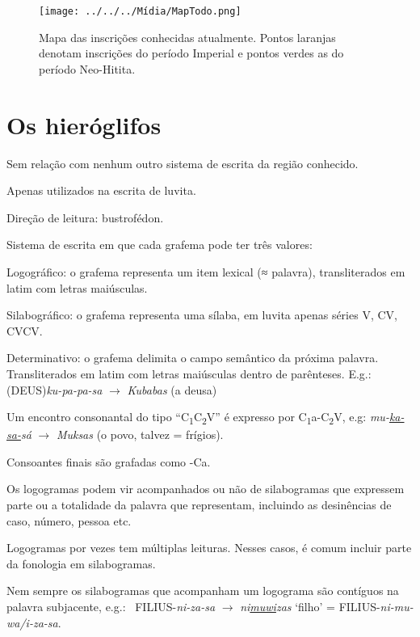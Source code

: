 \documentclass[article]{luvita}
\begin{document}
\begin{figure}[htb]
	\begin{center}
		\texttt{[image: ../../../Mídia/MapTodo.png]}
	\end{center}
	\caption{Mapa das inscrições conhecidas atualmente. Pontos laranjas
		denotam inscrições do período Imperial e pontos verdes as do período
		Neo-Hitita.
	}\label{fig:todo}
\end{figure}

\chapter{Os hieróglifos}

\begin{compactitem}
	\item Sem relação com nenhum outro sistema de escrita da região conhecido.
	\item Apenas utilizados na escrita de luvita.
	\item Direção de leitura: bustrofédon.
	\item Sistema de escrita em que cada grafema pode ter três valores:
	\begin{compactitem}
		\item Logográfico: o grafema representa um item lexical (≈ palavra),
		transliterados em latim com letras maiúsculas.
		\item Silabográfico: o grafema representa uma sílaba, em luvita apenas séries V,
		CV, CVCV.
		\item Determinativo: o grafema delimita o campo semântico da próxima
		palavra. Transliterados em latim com letras maiúsculas dentro de parênteses.
		E.g.:  (DEUS)\emph{ku-pa-pa-sa} $\rightarrow$ \emph{Kubabas} (a deusa)
	\end{compactitem}
	\item Um encontro consonantal do tipo ``C\textsubscript{1}C\textsubscript{2}V''
	é expresso por C\textsubscript{1}a-C\textsubscript{2}V, e.g:
	 \emph{mu-\uline{ka-sa-}sá} $\rightarrow$
	\emph{Muksas} (o povo, talvez = frígios).
	\item Consoantes finais são grafadas como -Ca.
	\item Os logogramas podem vir acompanhados ou não de silabogramas que expressem
	parte ou a totalidade da palavra que representam, incluindo as desinências de
	caso, número, pessoa etc.
	\item Logogramas por vezes tem múltiplas leituras. Nesses casos, é comum incluir
	parte da fonologia em silabogramas.
	\item Nem sempre os silabogramas que acompanham um logograma são contíguos na
	palavra subjacente, e.g.:\ 
	FILIUS-\emph{ni-za-sa} $\rightarrow$ \emph{ni\uline{muwi}zas} `filho' =
	 FILIUS-\emph{ni-mu-wa/i-za-sa}.
\end{compactitem}
\end{document}
